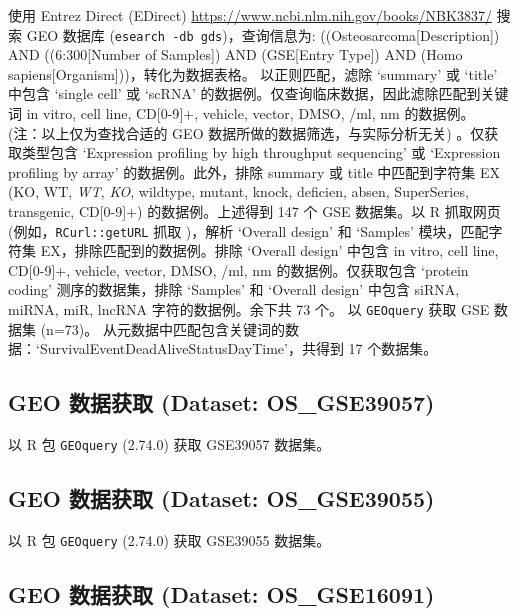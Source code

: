 \documentclass[
]{article}
\begin{document}
使用 Entrez Direct (EDirect) \url{https://www.ncbi.nlm.nih.gov/books/NBK3837/} 搜索 GEO 数据库 (\texttt{esearch\ -db\ gds})，查询信息为: ((Osteosarcoma{[}Description{]}) AND ((6:300{[}Number of Samples{]}) AND (GSE{[}Entry Type{]}) AND (Homo sapiens{[}Organism{]}))，转化为数据表格。
以正则匹配，滤除 `summary' 或 `title' 中包含 `single cell' 或 `scRNA' 的数据例。仅查询临床数据，因此滤除匹配到关键词 in vitro, cell line, CD{[}0-9{]}+, vehicle, vector, DMSO, /ml, nm 的数据例。
(注：以上仅为查找合适的 GEO 数据所做的数据筛选，与实际分析无关) 。仅获取类型包含 `Expression profiling by high throughput sequencing' 或 `Expression profiling by array' 的数据例。此外，排除 summary 或 title 中匹配到字符集 EX (KO, WT, \emph{WT}, \emph{KO}, wildtype, mutant, knock, deficien, absen, SuperSeries, transgenic, CD{[}0-9{]}+) 的数据例。上述得到 147 个 GSE 数据集。以 R 抓取网页 (例如，\texttt{RCurl::getURL} 抓取 )，解析 `Overall design' 和 `Samples' 模块，匹配字符集 EX，排除匹配到的数据例。排除 `Overall design' 中包含 in vitro, cell line, CD{[}0-9{]}+, vehicle, vector, DMSO, /ml, nm 的数据例。仅获取包含 `protein coding' 测序的数据集，排除 `Samples' 和 `Overall design' 中包含 siRNA, miRNA, miR, lncRNA 字符的数据例。余下共 73 个。
以 \texttt{GEOquery} 获取 GSE 数据集 (n=73)。
从元数据中匹配包含关键词的数据：`Survival\textbar Event\textbar Dead\textbar Alive\textbar Status\textbar Day\textbar Time'，共得到 17 个数据集。

\hypertarget{geo-ux6570ux636eux83b7ux53d6-dataset-os_gse39057}{%
\subsection{GEO 数据获取 (Dataset: OS\_GSE39057)}\label{geo-ux6570ux636eux83b7ux53d6-dataset-os_gse39057}}

以 R 包 \texttt{GEOquery} (2.74.0) 获取 GSE39057 数据集。

\hypertarget{geo-ux6570ux636eux83b7ux53d6-dataset-os_gse39055}{%
\subsection{GEO 数据获取 (Dataset: OS\_GSE39055)}\label{geo-ux6570ux636eux83b7ux53d6-dataset-os_gse39055}}

以 R 包 \texttt{GEOquery} (2.74.0) 获取 GSE39055 数据集。

\hypertarget{geo-ux6570ux636eux83b7ux53d6-dataset-os_gse16091}{%
\subsection{GEO 数据获取 (Dataset: OS\_GSE16091)}\label{geo-ux6570ux636eux83b7ux53d6-dataset-os_gse16091}}
\end{document}
